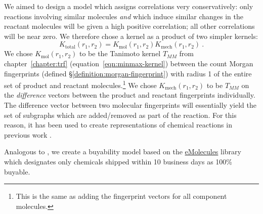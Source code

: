 We aimed to design a model which assigns correlations very conservatively:
only reactions involving similar molecules \emph{and} which induce similar changes in the reactant molecules
will be given a high positive correlation; all other correlations will be near zero.
We therefore chose a kernel as a product of two simpler kernels:
\begin{equation*}
    K_\text{total}(r_1,r_2)=K_\text{mol}(r_1,r_2)K_\text{mech}(r_1,r_2)\ .
\end{equation*}
We chose $K_\text{mol}(r_1,r_2)$ to be the Tanimoto kernel
$T_{MM}$ from chapter~\ref{chapter:trf} (equation~\ref{eqn:minmax-kernel})
between the count Morgan fingerprints (defined \S\ref{definition:morgan-fingerprint})
with radius 1 of the entire set of product and reactant molecules.\footnote{
This is the same as adding the fingerprint vectors for all component molecules.
}
We chose $K_\text{mech}(r_1,r_2)$ to be $T_{MM}$ on the \emph{difference} vectors between the product and reactant fingerprints individually.
The difference vector between two molecular fingerprints will essentially yield the set of subgraphs
which are added/removed as part of the reaction.
For this reason, it has been used to create representations of chemical reactions
in previous work \citep{schneider2015development}.

Analogous to \citet{chen2020retro},
we create a buyability model based on the \href{https://www.emolecules.com/}{eMolecules} library
which designates only chemicals shipped within 10 business
days
as 100\% buyable.

